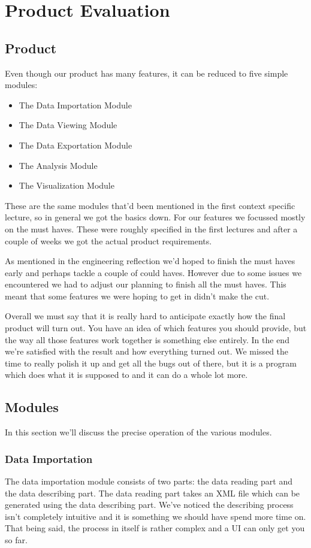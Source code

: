 \chapter{Product Evaluation} %

\section{Product}
Even though our product has many features, it can be reduced to five simple modules:
\begin{itemize}
	\item The Data Importation Module
	\item The Data Viewing Module
	\item The Data Exportation Module
	\item The Analysis Module
	\item The Visualization Module
\end{itemize}
These are the same modules that'd been mentioned in the first context specific lecture, so in general we got the basics down. For our features we focussed mostly on the must haves. These were roughly specified in the first lectures and after a couple of weeks we got the actual product requirements.

As mentioned in the engineering reflection we'd hoped to finish the must haves early and perhaps tackle a couple of could haves. However due to some issues we encountered we had to adjust our planning to finish all the must haves. This meant that some features we were hoping to get in didn't make the cut.

Overall we must say that it is really hard to anticipate exactly how the final product will turn out. You have an idea of which features you should provide, but the way all those features work together is something else entirely. In the end we're satisfied with the result and how everything turned out. We missed the time to really polish it up and get all the bugs out of there, but it is a program which does what it is supposed to and it can do a whole lot more.

\section{Modules}
In this section we'll discuss the precise operation of the various modules.

\subsection{Data Importation}
The data importation module consists of two parts: the data reading part and the data describing part. The data reading part takes an XML file which can be generated using the data describing part. We've noticed the describing process isn't completely intuitive and it is something we should have spend more time on. That being said, the process in itself is rather complex and a UI can only get you so far.

